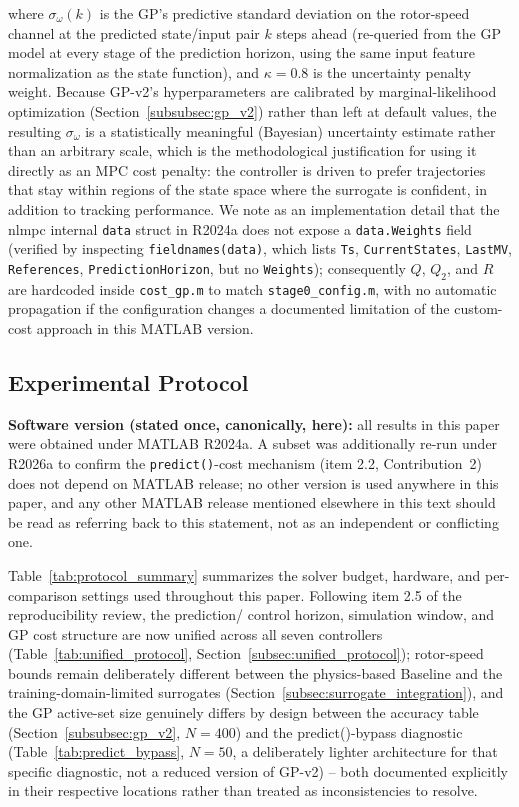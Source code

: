 where $\sigma_{\omega}(k)$ is the GP's predictive standard deviation on
the rotor-speed channel at the predicted state/input pair $k$ steps ahead
(re-queried from the GP model at every stage of the prediction horizon,
using the same input feature normalization as the state function), and
$\kappa=0.8$ is the uncertainty penalty weight. Because GP-v2's
hyperparameters are calibrated by marginal-likelihood optimization
(Section~\ref{subsubsec:gp_v2}) rather than left at default values, the
resulting $\sigma_\omega$ is a statistically meaningful (Bayesian)
uncertainty estimate rather than an arbitrary scale, which is the
methodological justification for using it directly as an MPC cost penalty:
the controller is driven to prefer trajectories that stay within regions
of the state space where the surrogate is confident, in addition to
tracking performance. We note as an implementation detail that the nlmpc
internal \texttt{data} struct in R2024a does not expose a
\texttt{data.Weights} field (verified by inspecting
\texttt{fieldnames(data)}, which lists \texttt{Ts},
\texttt{CurrentStates}, \texttt{LastMV}, \texttt{References},
\texttt{PredictionHorizon}, but no \texttt{Weights}); consequently $Q$,
$Q_2$, and $R$ are hardcoded inside \texttt{cost\_gp.m} to match
\texttt{stage0\_config.m}, with no automatic propagation if the
configuration changes a documented limitation of the custom-cost
approach in this MATLAB version.

\subsection{Experimental Protocol}
\label{subsec:experimental_protocol}

\textbf{Software version (stated once, canonically, here):} all
results in this paper were obtained under MATLAB R2024a. A subset
was additionally re-run under R2026a to confirm the
\texttt{predict()}-cost mechanism (item 2.2, Contribution~2) does not
depend on MATLAB release; no other version is used anywhere in this
paper, and any other MATLAB release mentioned elsewhere in this text
should be read as referring back to this statement, not as an
independent or conflicting one.

Table~\ref{tab:protocol_summary} summarizes the solver budget,
hardware, and per-comparison settings used throughout this paper.
Following item 2.5 of the reproducibility review, the prediction/
control horizon, simulation window, and GP cost structure are now
unified across all seven controllers (Table~\ref{tab:unified_protocol},
Section~\ref{subsec:unified_protocol}); rotor-speed bounds remain
deliberately different between the physics-based Baseline and the
training-domain-limited surrogates (Section~\ref{subsec:surrogate_integration}),
and the GP active-set size genuinely differs by design between the
accuracy table (Section~\ref{subsubsec:gp_v2}, $N=400$) and the
predict()-bypass diagnostic (Table~\ref{tab:predict_bypass}, $N=50$,
a deliberately lighter architecture for that specific diagnostic, not
a reduced version of GP-v2) -- both documented explicitly in their
respective locations rather than treated as inconsistencies to
resolve.

